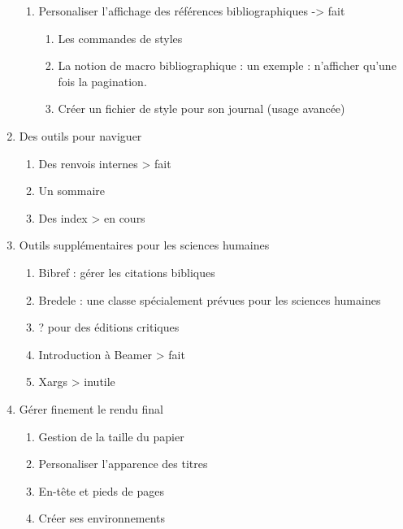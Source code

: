 \begin{enumerate}
\begin{enumerate}
\item Personaliser l'affichage des références bibliographiques	-> fait
	\begin{enumerate}
	\item Les commandes de styles
	\item La notion de macro bibliographique : un exemple : n'afficher qu'une fois la pagination.
	\item Créer un fichier de style pour son journal (usage avancée)
	\end{enumerate}	
\end{enumerate}

\item Des outils pour naviguer
\begin{enumerate}
\item Des renvois internes					> fait
\item Un sommaire
\item Des index							> en cours
\end{enumerate}

\item Outils supplémentaires pour les sciences humaines
\begin{enumerate}
\item Bibref : gérer les citations bibliques
\item Bredele : une classe spécialement prévues pour les sciences humaines
\item ? pour des éditions critiques
\item Introduction à Beamer					> fait
\item Xargs								> inutile
\end{enumerate}

\item Gérer finement le rendu final
\begin{enumerate}
\item Gestion de la taille du papier
\item Personaliser l'apparence des titres
\item En-tête et pieds de pages
\item Créer ses environnements
\end{enumerate}


\end{enumerate}
